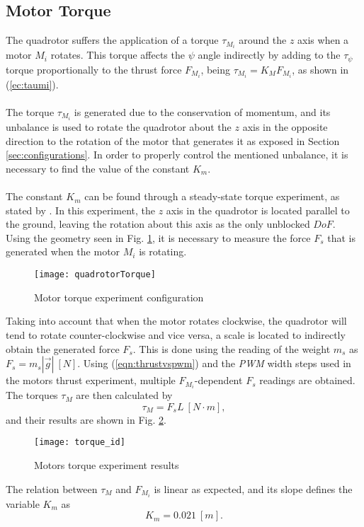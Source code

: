 \subsection{Motor Torque}
The quadrotor suffers the application of a torque $\tau_{M_{i}}$ around the $z$ axis when a motor $M_i$ rotates. This torque affects the $\psi$ angle indirectly by adding to the $\tau_\psi$ torque proportionally to the thrust force $F_{M_i}$, being $\tau_{M_i} = K_{M}F_{M_i}$, as shown in (\ref{ec:taumi}).
\\\\
The torque $\tau_{M_{i}}$ is generated due to the conservation of momentum, and its unbalance is used to rotate the quadrotor about the $z$ axis in the opposite direction to the rotation of the motor that generates it as exposed in Section \ref{sec:configurations}. In order to properly control the mentioned unbalance, it is necessary to find the value of the constant $K_m$.
\\\\
The constant $K_{m}$ can be found through a steady-state torque experiment, as stated by \cite{Oliveira2012}. In this experiment, the $z$ axis in the quadrotor is located parallel to the ground, leaving the rotation about this axis as the only unblocked $DoF$. Using the geometry seen in Fig. \ref{fig:quadrotortorque}, it is necessary to measure the force $F_s$ that is generated when the motor $M_i$ is rotating.
\begin{figure}[H]
	\begin{center}
		\texttt{[image: quadrotorTorque]}    
		\caption{Motor torque experiment configuration} 
		\label{fig:quadrotortorque}
	\end{center}
\end{figure}
Taking into account that when the motor rotates clockwise, the quadrotor will tend to rotate counter-clockwise and vice versa, a scale is located to indirectly obtain the generated force $F_{s}$. This is done using the reading of the weight $m_s$ as $F_{s} = m_{s}|\vec{g}|\ [N]$. Using (\ref{eqn:thrustvspwm}) and the \textit{PWM} width steps used in the motors thrust experiment, multiple $F_{M_i}$-dependent $F_s$ readings are obtained. The torques $\tau_M$ are then calculated by
\begin{equation}
\tau_{M} = F_{s}L\ [N\cdot m],
\end{equation}
and their results are shown in Fig. \ref{fig:torque_id}.
\begin{figure}[H]
	\begin{center}
		\texttt{[image: torque\_id]}    
		\caption{Motors torque experiment results} 
		\label{fig:torque_id}
	\end{center}
\end{figure}
The relation between $\tau_M$ and $F_{M_i}$ is linear as expected, and its slope defines the variable $K_m$ as
\begin{equation}
K_{m} = 0.021\ [m].
\end{equation}


